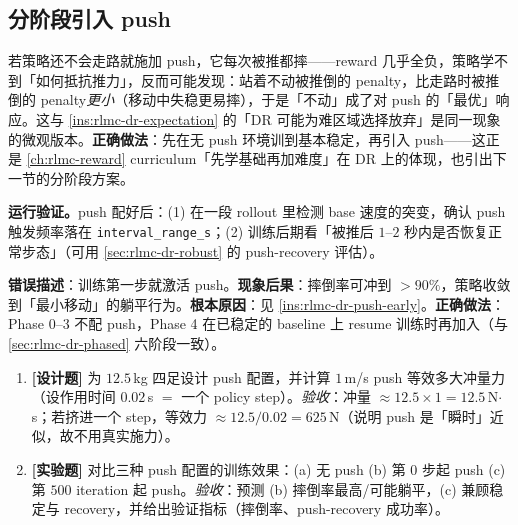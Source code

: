 \subsection{分阶段引入 push}
\label{sec:rlmc-dr-force-phased}

\begin{insight}\label{ins:rlmc-dr-push-early}
若策略还不会走路就施加 push，它每次被推都摔——reward 几乎全负，策略学不到「如何抵抗推力」，反而可能发现：站着不动被推倒的 penalty，比走路时被推倒的 penalty\emph{更小}（移动中失稳更易摔），于是「不动」成了对 push 的「最优」响应。这与 \cref{ins:rlmc-dr-expectation} 的「DR 可能为难区域选择放弃」是同一现象的微观版本。\textbf{正确做法}：先在无 push 环境训到基本稳定，再引入 push——这正是 \cref{ch:rlmc-reward} curriculum「先学基础再加难度」在 DR 上的体现，也引出下一节的分阶段方案。
\end{insight}

\textbf{运行验证。}push 配好后：(1) 在一段 rollout 里检测 base 速度的突变，确认 push 触发频率落在 \verb|interval_range_s|；(2) 训练后期看「被推后 $1$--$2$ 秒内是否恢复正常步态」（可用 \cref{sec:rlmc-dr-robust} 的 push-recovery 评估）。

\begin{pitfall}
\textbf{错误描述}：训练第一步就激活 push。\textbf{现象后果}：摔倒率可冲到 $>90\%$，策略收敛到「最小移动」的躺平行为。\textbf{根本原因}：见 \cref{ins:rlmc-dr-push-early}。\textbf{正确做法}：Phase 0--3 不配 push，Phase 4 在已稳定的 baseline 上 resume 训练时再加入（与 \cref{sec:rlmc-dr-phased} 六阶段一致）。
\end{pitfall}

\begin{practice}[本节练习]
\begin{enumerate}
  \item \textbf{[设计题]} 为 $12.5$\,kg 四足设计 push 配置，并计算 $1$\,m/s push 等效多大冲量力（设作用时间 $0.02$\,s $=$ 一个 policy step）。\emph{验收}：冲量 $\approx 12.5\times 1=12.5$\,N$\cdot$s；若挤进一个 step，等效力 $\approx 12.5/0.02=625$\,N（说明 push 是「瞬时」近似，故不用真实施力）。
  \item \textbf{[实验题]} 对比三种 push 配置的训练效果：(a) 无 push (b) 第 $0$ 步起 push (c) 第 $500$ iteration 起 push。\emph{验收}：预测 (b) 摔倒率最高/可能躺平，(c) 兼顾稳定与 recovery，并给出验证指标（摔倒率、push-recovery 成功率）。
\end{enumerate}
\end{practice}

